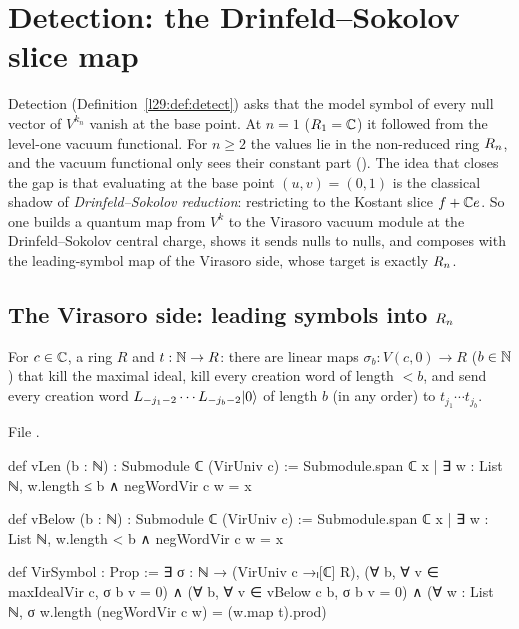\section{Detection: the Drinfeld--Sokolov slice map}\label{l29:sec:ds}

Detection (Definition~\ref{l29:def:detect}) asks that the model symbol of every null vector of $V^{k_n}$ vanish at the
base point. At $n=1$ ($R_1={\mathbb{C}}$) it followed from the level-one vacuum functional. For $n\ge2$ the values lie in the
non-reduced ring $R_n$, and the vacuum functional only sees their constant part ().
The idea that closes the gap is that evaluating at the base point $(u,v)=(0,1)$ is the classical shadow of
\emph{Drinfeld--Sokolov reduction}: restricting to the Kostant slice $f+{\mathbb{C}} e$. So one builds a quantum map from
$V^{k}$ to the Virasoro vacuum module at the Drinfeld--Sokolov central charge, shows it sends nulls to nulls, and
composes with the leading-symbol map of the Virasoro side, whose target is exactly $R_n$.

\subsection{The Virasoro side: leading symbols into $R_n$}

\begin{definition}\label{l29:def:virsymbol}
For $c\in{\mathbb{C}}$, a ring $R$ and $t:{\mathbb{N}}\to R$: there are linear maps $\sigma_b:V(c,0)\to R$ ($b\in{\mathbb{N}}$) that kill the
maximal ideal, kill every creation word of length $<b$, and send every creation word
$L_{-j_1-2}\cdots L_{-j_b-2}|0\rangle$ of length $b$ (in any order) to $t_{j_1}\cdots t_{j_b}$.
\end{definition}

\noindent File .
\begin{leancode}
def vLen (b : ℕ) : Submodule ℂ (VirUniv c) :=
  Submodule.span ℂ {x | ∃ w : List ℕ, w.length ≤ b ∧ negWordVir c w = x}

def vBelow (b : ℕ) : Submodule ℂ (VirUniv c) :=
  Submodule.span ℂ {x | ∃ w : List ℕ, w.length < b ∧ negWordVir c w = x}

def VirSymbol : Prop :=
  ∃ σ : ℕ → (VirUniv c →ₗ[ℂ] R),
    (∀ b, ∀ v ∈ maxIdealVir c, σ b v = 0) ∧
    (∀ b, ∀ v ∈ vBelow c b, σ b v = 0) ∧
    (∀ w : List ℕ, σ w.length (negWordVir c w) = (w.map t).prod)
\end{leancode}


